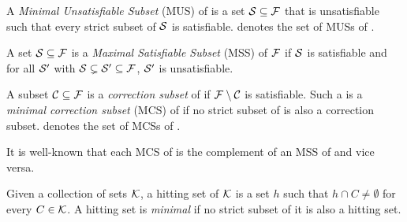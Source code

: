 \begin{definition}
  A \emph{Minimal Unsatisfiable Subset} (MUS) of \F is a set $\mathcal{S} \subseteq \mathcal{F} $  that is unsatisfiable such that every strict subset of $\mathcal{S} $ is satisfiable. 
%   
  \muses{\F} denotes the set of MUSs of \F. 
\end{definition}



\begin{definition}
    A set $\mathcal{S} \subseteq \mathcal{F} $ is a \emph{Maximal Satisfiable Subset} (MSS) of $ \mathcal{F} $ if $\mathcal{S}$ is satisfiable and for all $\mathcal{S}'$ with $\mathcal{S}  \subsetneq  \mathcal{S}'\subseteq\mathcal{F}  $, $\mathcal{S}'$ is unsatisfiable.
\end{definition}

\begin{definition}
    A subset $\mathcal{C} \subseteq \mathcal{F} $ is a \emph{correction subset} of \formula if $\mathcal{F} \setminus\mathcal{C}$ is satisfiable. 
    Such a  is a \emph{minimal correction subset} (MCS)  of \formula if no strict subset of  is also a correction subset. 
    \mcses{\F} denotes the set of MCSs of \F. 
\end{definition}

It is well-known that each  MCS of \formula is the complement of an MSS of \formula and vice versa. 

\begin{definition}\label{def:minimal-hs}
    Given a collection of sets $\mathcal{K}$, a hitting set of $\mathcal{K}$ is a set $h$ such that  $h \cap C \neq \emptyset$ for every $C \in \mathcal{K}$. A hitting set is \emph{minimal} if no strict subset of it is also a hitting set. 
\end{definition}




